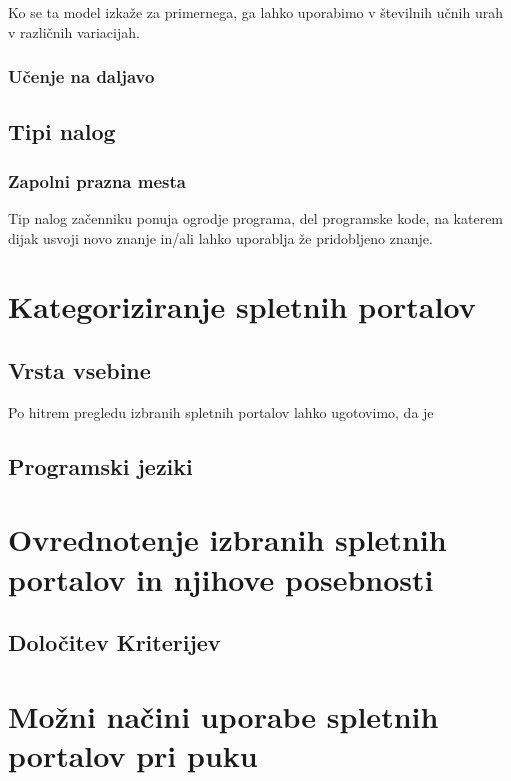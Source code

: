 Ko se ta model izkaže za primernega, ga lahko uporabimo v številnih
učnih urah v različnih variacijah.

\subsubsection{Učenje  na daljavo}
\label{sec:Učenje_na_daljavo}


\subsection{Tipi nalog}
\label{tipi_nalog}

\subsubsection{Zapolni prazna mesta}
\label{sec:zapolni_prazna_mesta}

Tip nalog začenniku ponuja ogrodje programa, del programske kode, na
katerem dijak usvoji novo znanje in/ali lahko uporablja že pridobljeno
znanje.


\section{Kategoriziranje spletnih portalov}
\label{sec:kategoriziranje_spletnih_portalov}

\subsection{Vrsta vsebine}
\label{sec:Razvrstitev_spletnih_portalov}

Po hitrem pregledu izbranih spletnih portalov lahko ugotovimo, da je

\subsection{Programski jeziki}
\label{sec:programski_jeziki}


\section{Ovrednotenje izbranih spletnih portalov in njihove posebnosti}
\label{sec:pregled_spletnih_portalov}

\subsection{Določitev Kriterijev}
\label{sec:dolocitev_kriterijev}


\section{Možni načini uporabe spletnih portalov pri puku}
\label{sec:načini_uporabe_sp}









